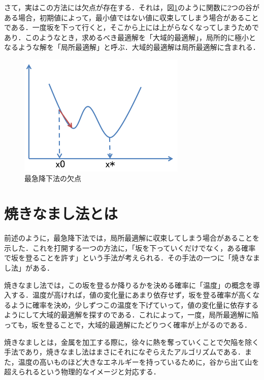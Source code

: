 \documentclass{jarticle}
\begin{document}
さて，実はこの方法には欠点が存在する．それは，図\ref{fig:two}のように関数に$2$つの谷がある場合，初期値によって，最小値ではない値に収束してしまう場合があることである．一度坂を下って行くと，そこから上には上がらなくなってしまうためであり．このようなとき，求めるべき最適解を「大域的最適解」，局所的に極小となるような解を「局所最適解」と呼ぶ．大域的最適解は局所最適解に含まれる．
\begin{figure}[H]
\begin{center}
	\includegraphics[width=80mm]{image/two.png}
	\caption{最急降下法の欠点}
	\label{fig:two}
\end{center}
\end{figure}


\section{焼きなまし法とは}
前述のように，最急降下法では，局所最適解に収束してしまう場合があることを示した．これを打開する一つの方法に，「坂を下っていくだけでなく，ある確率で坂を登ることを許す」という手法が考えられる．その手法の一つに「焼きなまし法」がある．

焼きなまし法では，この坂を登るか降りるかを決める確率に「温度」の概念を導入する．温度が高ければ，値の変化量にあまり依存せず，坂を登る確率が高くなるように確率を決め，少しずつこの温度を下げていって，値の変化量に依存するようにして大域的最適解を探すのである．これによって，一度，局所最適解に陥っても，坂を登ることで，大域的最適解にたどりつく確率が上がるのである．

焼きなましとは，金属を加工する際に，徐々に熱を奪っていくことで欠陥を除く手法であり，焼きなまし法はまさにそれになぞらえたアルゴリズムである．また，温度の高いものほど大きなエネルギーを持っているために，谷から出て山を超えられるという物理的なイメージと対応する．
\end{document}
